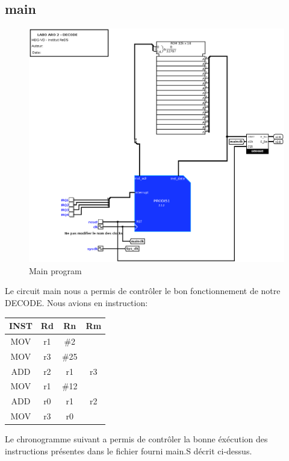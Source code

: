 \documentclass[a4paper]{article} %
\begin{document}
\subsection{main}
\begin{figure}[H]
    \centering
    \includegraphics[width=1\textwidth]{src/Et4_main.png}
    \caption{Main program}
    \label{main_img}
\end{figure}

Le circuit main nous a permis de contrôler le bon fonctionnement de notre DECODE. Nous avions en instruction: \\

\begin{tabular}{|c|c|c|c|}
    
    \hline
    INST & Rd & Rn  & Rm  \\
    \hline
    MOV  & r1 & \#2  &    \\
    \hline
    MOV  & r3 & \#25 &    \\
    \hline
    ADD  & r2 & r1   & r3 \\
    \hline
    MOV  & r1 & \#12 &    \\
    \hline
    ADD  & r0 & r1   & r2 \\
    \hline
    MOV  & r3 & r0   &    \\
    \hline
\end{tabular}

Le chronogramme suivant a permis de contrôler la bonne éxécution des instructions présentes dans le fichier fourni main.S décrit ci-dessus.
\end{document}
